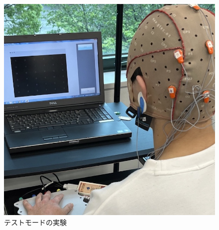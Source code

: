 \begin{figure}[H]
\begin{minipage}[b]{.32\textwidth}
        \includegraphics[keepaspectratio,width=.7\textwidth]{../../12_DataAnalysis/bmi_exp2.jpeg}
        \caption{テストモードの実験}
    \end{minipage}
\end{figure}
